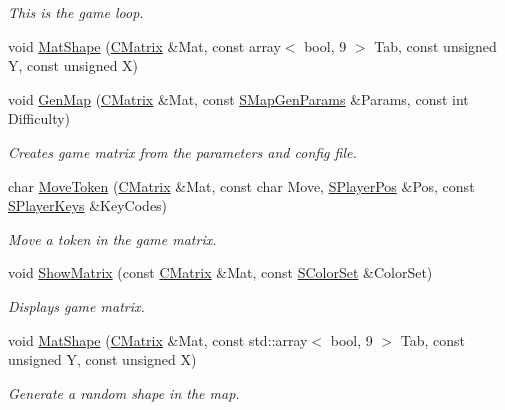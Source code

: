 \begin{DoxyCompactItemize}
\begin{DoxyCompactList}\small\item\em This is the game loop. \end{DoxyCompactList}\item 
void \hyperlink{namespace_chase_game_ac12626138d0e2c49669eba73ffb4e4b7}{Mat\-Shape} (\hyperlink{namespace_chase_game_a469449f9237e59efce3982127366c550}{C\-Matrix} \&Mat, const array$<$ bool, 9 $>$ Tab, const unsigned Y, const unsigned X)
\item 
void \hyperlink{namespace_chase_game_a15617c8a111cd66bf5d24fd1e82a119d}{Gen\-Map} (\hyperlink{namespace_chase_game_a469449f9237e59efce3982127366c550}{C\-Matrix} \&Mat, const \hyperlink{struct_chase_game_1_1_s_map_gen_params}{S\-Map\-Gen\-Params} \&Params, const int Difficulty)
\begin{DoxyCompactList}\small\item\em Creates game matrix from the parameters and config file. \end{DoxyCompactList}\item 
char \hyperlink{namespace_chase_game_a1dfe4bdbd50ee18cf85760219ea90b03}{Move\-Token} (\hyperlink{namespace_chase_game_a469449f9237e59efce3982127366c550}{C\-Matrix} \&Mat, const char Move, \hyperlink{struct_chase_game_1_1_s_player_pos}{S\-Player\-Pos} \&Pos, const \hyperlink{struct_chase_game_1_1_s_player_keys}{S\-Player\-Keys} \&Key\-Codes)
\begin{DoxyCompactList}\small\item\em Move a token in the game matrix. \end{DoxyCompactList}\item 
void \hyperlink{namespace_chase_game_a871395f1f12e55eaa3d341b8ef2cbb78}{Show\-Matrix} (const \hyperlink{namespace_chase_game_a469449f9237e59efce3982127366c550}{C\-Matrix} \&Mat, const \hyperlink{struct_chase_game_1_1_s_color_set}{S\-Color\-Set} \&Color\-Set)
\begin{DoxyCompactList}\small\item\em Displays game matrix. \end{DoxyCompactList}\item 
void \hyperlink{namespace_chase_game_a049d8d8beb22431889ca7ba34cc90871}{Mat\-Shape} (\hyperlink{namespace_chase_game_a469449f9237e59efce3982127366c550}{C\-Matrix} \&Mat, const std\-::array$<$ bool, 9 $>$ Tab, const unsigned Y, const unsigned X)
\begin{DoxyCompactList}\small\item\em Generate a random shape in the map. \end{DoxyCompactList}\item 

\end{DoxyCompactItemize}
